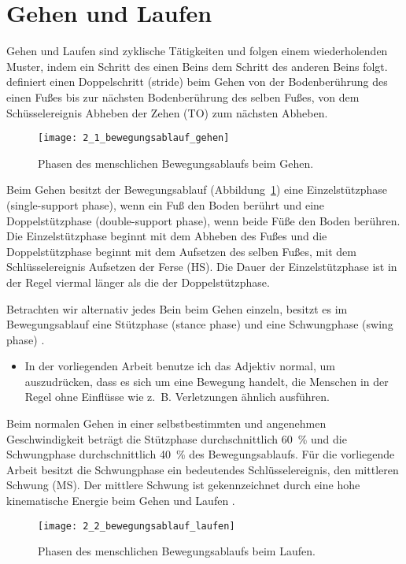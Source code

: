 

\section{Gehen und Laufen} 

\label{sec:gehen_und_laufen}

Gehen und Laufen sind zyklische Tätigkeiten und folgen einem wiederholenden Muster, indem ein Schritt des einen Beins dem Schritt des anderen Beins folgt. \citet[][S.~9]{Bartlett2007} definiert einen Doppelschritt (stride) beim Gehen von der Bodenberührung des einen Fußes bis zur nächsten Bodenberührung des selben Fußes, von dem Schüsselereignis Abheben der Zehen (\ac{TO}) zum nächsten Abheben. 
\begin{figure}
	[ht] \centering 
	\texttt{[image: 2\_1\_bewegungsablauf\_gehen]} \caption[Phasen des menschlichen Bewegungsablaufs beim Gehen]{Phasen des menschlichen Bewegungsablaufs beim Gehen.}\label{fig:2_1_bewegungsablauf_gehen} 
\end{figure}

Beim Gehen besitzt der Bewegungsablauf (Abbildung~\ref{fig:2_1_bewegungsablauf_gehen}) eine Einzelstützphase (single-support phase), wenn ein Fuß den Boden berührt und eine Doppelstützphase (double-support phase), wenn beide Füße den Boden berühren. Die Einzelstützphase beginnt mit dem Abheben des Fußes und die Doppelstützphase beginnt mit dem Aufsetzen des selben Fußes, mit dem Schlüsselereignis Aufsetzen der Ferse (\ac{HS}). Die Dauer der Einzelstützphase ist in der Regel viermal länger als die der Doppelstützphase. 

Betrachten wir alternativ jedes Bein beim Gehen einzeln, besitzt es im Bewegungsablauf eine Stützphase (stance phase) und eine Schwungphase (swing phase) \citep[][]{Bartlett2007}. 
\begin{itemize}
	
	\item In der vorliegenden Arbeit benutze ich das Adjektiv normal, um auszudrücken, dass es sich um eine Bewegung handelt, die Menschen in der Regel ohne Einflüsse wie z.~B. Verletzungen ähnlich ausführen.
\end{itemize}

Beim normalen Gehen in einer selbstbestimmten und angenehmen Geschwindigkeit beträgt die Stützphase durchschnittlich 60~\% und die Schwungphase durchschnittlich 40~\% des Bewegungsablaufs. Für die vorliegende Arbeit besitzt die Schwungphase ein bedeutendes Schlüsselereignis, den mittleren Schwung (\ac{MS}). Der mittlere Schwung ist gekennzeichnet durch eine hohe kinematische Energie beim Gehen und Laufen \citep[][]{Novacheck1998}.
\begin{figure}
	[ht] \centering 
	\texttt{[image: 2\_2\_bewegungsablauf\_laufen]} \caption[Phasen des menschlichen Bewegungsablaufs beim Laufen]{Phasen des menschlichen Bewegungsablaufs beim Laufen.}\label{fig:2_2_bewegungsablauf_laufen} 
\end{figure}

